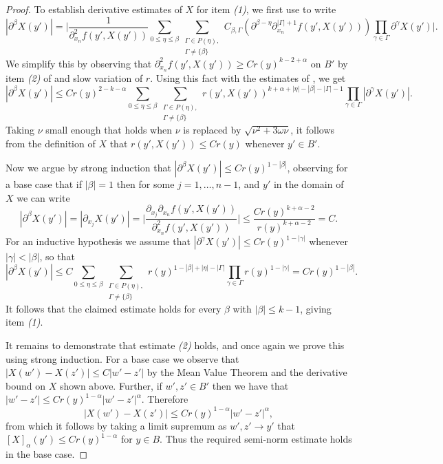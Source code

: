 \documentclass[oneside,hidelinks,indentfirst,10pt]{book}
\begin{document}
\begin{proof}
To establish derivative estimates of \(X\) for item \textit{(1)}, we first use  to write
\[
    |\partial^\beta X(y')|=\bigg|\frac{1}{\partial^2_{x_n}f(y',X(y'))}\sum_{0\leq\eta\leq\beta}\sum_{ \substack{\Gamma\in P(\eta),\\\Gamma\neq \{\beta\}}}C_{\beta,\Gamma}(\partial^{\beta-\eta}\partial^{|\Gamma|+1}_{x_n}f(y',X(y')))\prod_{\gamma\in\Gamma}\partial^\gamma X(y')\bigg|.
\]
We simplify this by observing that \(\partial^2_{x_n}f(y',X(y'))\geq Cr(y)^{k-2+\alpha}\) on \(B'\) by item \textit{(2)} of  and slow variation of \(r\). Using this fact with the estimates of , we get
\[
    |\partial^\beta X(y')|\leq Cr(y)^{2-k-\alpha}\sum_{0\leq\eta\leq\beta}\sum_{ \substack{\Gamma\in P(\eta),\\\Gamma\neq \{\beta\}}}r(y',X(y'))^{k+\alpha+|\eta|-|\beta|-|\Gamma|-1}\prod_{\gamma\in\Gamma}|\partial^\gamma X(y')|.
\]
Taking \(\nu\) small enough that  holds when \(\nu\) is replaced by \(\sqrt{\nu^2+3\omega\nu}\), it follows from the definition of \(X\) that \(r(y',X(y'))\leq Cr(y)\) whenever \(y'\in B'\).


Now we argue by strong induction that \(|\partial^\beta X(y')|\leq Cr(y)^{1-|\beta|}\), observing for a base case that if \(|\beta|=1\) then for some \(j=1,\dots,n-1\), and \(y'\) in the domain of \(X\) we can write 
\[
    |\partial^\beta X(y')|=|\partial_{x_j}X(y')|=\bigg|\frac{\partial_{x_j}\partial_{x_n}f(y',X(y'))}{\partial^2_{x_n}f(y',X(y'))}\bigg|\leq \frac{Cr(y)^{k+\alpha-2}}{r(y)^{k+\alpha-2}}=C.
\]
For an inductive hypothesis we assume that \(|\partial^\gamma X(y')|\leq Cr(y)^{1-|\gamma|}\) whenever \(|\gamma|<|\beta|\), so that
\[
    |\partial^\beta X(y')|\leq C\sum_{0\leq\eta\leq\beta}\sum_{ \substack{\Gamma\in P(\eta),\\\Gamma\neq \{\beta\}}}r(y)^{1-|\beta|+|\eta|-|\Gamma|}\prod_{\gamma\in\Gamma}r(y)^{1-|\gamma|}=Cr(y)^{1-|\beta|}.
\]
It follows that the claimed estimate holds for every \(\beta\) with \(|\beta|\leq k-1\), giving item \textit{(1)}.

It remains to demonstrate that estimate \textit{(2)} holds, and once again we prove this using strong induction. For a base case we observe that \(|X(w')-X(z')|\leq C|w'-z'|\) by the Mean Value Theorem and the derivative bound on \(X\) shown above. Further, if \(w',z'\in B'\) then we have that \(|w'-z'|\leq Cr(y)^{1-\alpha}|w'-z'|^\alpha\). Therefore 
\[
    |X(w')-X(z')|\leq Cr(y)^{1-\alpha}|w'-z'|^\alpha,
\]
from which it follows by taking a limit supremum as \(w',z'\rightarrow y'\) that \([X]_{\alpha}(y')\leq Cr(y)^{1-\alpha}\) for \(y\in B\). Thus the required semi-norm estimate holds in the base case.



\end{proof}
\end{document}
